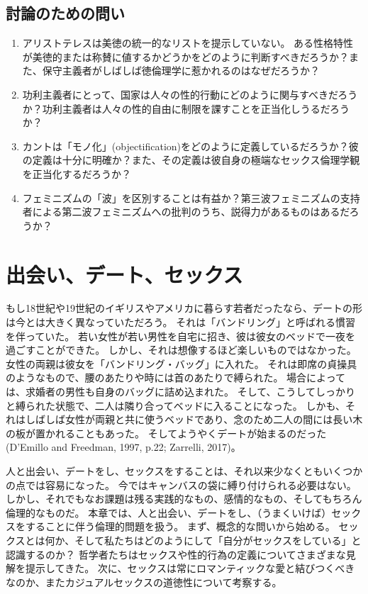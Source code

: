 \documentclass[paper=a4,book,openany]{jlreq} \usepackage{mystyle}
\begin{document}
\section{討論のための問い}
\begin{enumerate}
\item アリストテレスは美徳の統一的なリストを提示していない。
ある性格特性が美徳的または称賛に値するかどうかをどのように判断すべきだろうか？また、保守主義者がしばしば徳倫理学に惹かれるのはなぜだろうか？

    \item 功利主義者にとって、国家は人々の性的行動にどのように関与すべきだろうか？功利主義者は人々の性的自由に制限を課すことを正当化しうるだろうか？

    \item カントは「モノ化」(objectification)をどのように定義しているだろうか？彼の定義は十分に明確か？また、その定義は彼自身の極端なセックス倫理学観を正当化するだろうか？

    \item フェミニズムの「波」を区別することは有益か？第三波フェミニズムの支持者による第二波フェミニズムへの批判のうち、説得力があるものはあるだろうか？
\end{enumerate}

\chapter{出会い、デート、セックス}

もし18世紀や19世紀のイギリスやアメリカに暮らす若者だったなら、デートの形は今とは大きく異なっていただろう。
それは「バンドリング」と呼ばれる慣習を伴っていた。
若い女性が若い男性を自宅に招き、彼は彼女のベッドで一夜を過ごすことができた。
しかし、それは想像するほど楽しいものではなかった。
女性の両親は彼女を「バンドリング・バッグ」に入れた。
それは即席の貞操具のようなもので、腰のあたりや時には首のあたりで縛られた。
場合によっては、求婚者の男性も自身のバッグに詰め込まれた。
そして、こうしてしっかりと縛られた状態で、二人は隣り合ってベッドに入ることになった。
しかも、それはしばしば女性が両親と共に使うベッドであり、念のため二人の間には長い木の板が置かれることもあった。
そして{\DDASH}ようやくデートが始まるのだった(D'Emillo and Freedman, 1997, p.22; Zarrelli, 2017)。

\nocite{demilio97:_intim_matter}\nocite{zarrelli17:_awkwar_centur_datin}

人と出会い、デートをし、セックスをすることは、それ以来少なくともいくつかの点では容易になった。
今ではキャンバスの袋に縛り付けられる必要はない。
しかし、それでもなお課題は残る{\DDASH}実践的なもの、感情的なもの、そしてもちろん倫理的なものだ。
本章では、人と出会い、デートをし、（うまくいけば）セックスをすることに伴う倫理的問題を扱う。
まず、概念的な問いから始める。
セックスとは何か、そして私たちはどのようにして「自分がセックスをしている」と認識するのか？ 哲学者たちはセックスや性的行為の定義についてさまざまな見解を提示してきた。
次に、セックスは常にロマンティックな愛と結びつくべきなのか、またカジュアルセックスの道徳性について考察する。
\end{document}

